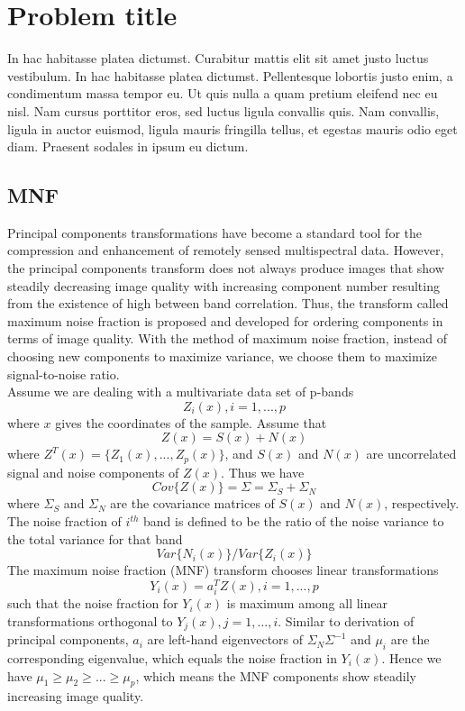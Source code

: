 \documentclass{article}
\begin{document}
\section{Problem title} %

In hac habitasse platea dictumst. Curabitur mattis elit sit amet justo luctus vestibulum. In hac habitasse platea dictumst. Pellentesque lobortis justo enim, a condimentum massa tempor eu. Ut quis nulla a quam pretium eleifend nec eu nisl. Nam cursus porttitor eros, sed luctus ligula convallis quis. Nam convallis, ligula in auctor euismod, ligula mauris fringilla tellus, et egestas mauris odio eget diam. Praesent sodales in ipsum eu dictum.


\subsection{MNF}

Principal components transformations have become a standard tool for the compression and enhancement of remotely sensed multispectral data. However, the principal components transform does not always produce images that show steadily decreasing image quality with increasing component number resulting from the existence of high between band correlation. Thus, the transform called maximum noise fraction is proposed and developed for ordering components in terms of image quality. With the method of maximum noise fraction, instead of choosing new components to maximize variance, we choose them to maximize signal-to-noise ratio.\\
Assume we are dealing with a multivariate data set of p-bands
$$Z_i(x), i = 1, ..., p$$
where $x$ gives the coordinates of the sample. Assume that 
$$Z(x)=S(x)+N(x)$$
where $Z^T(x) = \{Z_1(x), ..., Z_p(x)\}$, and $S(x)$ and $N(x)$ are uncorrelated signal and noise components of $Z(x)$. Thus we have
$$Cov\{Z(x)\} = \Sigma = \Sigma_S+\Sigma_N$$
where $\Sigma_S$ and $\Sigma_N$ are the covariance matrices of $S(x)$ and $N(x)$, respectively. 
The noise fraction of $i^{th}$ band is defined to be the ratio of the noise variance to the total variance for that band
$$Var\{N_i(x)\}/Var\{Z_i(x)\}$$
The maximum noise fraction (MNF) transform chooses linear transformations 
$$Y_i(x)=a_i^TZ(x), i = 1,...,p$$
such that the noise fraction for $Y_i(x)$ is maximum among all linear transformations orthogonal to $Y_j(x), j = 1, ..., i$.
Similar to derivation of principal components, $a_i$ are left-hand eigenvectors of $\Sigma_N\Sigma^{-1}$ and $\mu_i$ are the corresponding eigenvalue, which equals the noise fraction in $Y_i(x)$. Hence we have $\mu_1 \geq \mu_2\geq...\geq \mu_p$, which means the MNF components show steadily increasing image quality.
\end{document}

